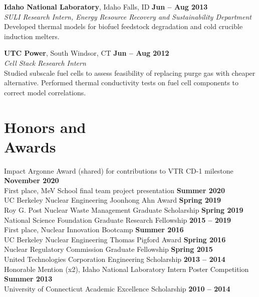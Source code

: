 \documentclass[margin,line]{resume}
\begin{document}
\begin{resume}
\textbf{Idaho National Laboratory}, Idaho Falls, ID \hfill 
    \textbf{Jun -- Aug 2013} \\
\textsl{SULI Research Intern, Energy Resource Recovery and Sustainability Department} \\
Developed thermal models for biofuel feedstock degradation and cold crucible induction melters.

\textbf{UTC Power}, South Windsor, CT \hfill 
    \textbf{Jun -- Aug 2012} \\
\textsl{Cell Stack Research Intern} \\
Studied subscale fuel cells to assess feasibility of replacing purge gas with cheaper alternative. Performed thermal conductivity tests on fuel cell components to correct model correlations.\\

\section{\mysidestyle Honors and\\Awards}
Impact Argonne Award (shared) for contributions to VTR CD-1 milestone \hfill \textbf{November 2020}\vspace{.5mm} \\
First place, MeV School final team project presentation \hfill \textbf{Summer 2020}\vspace{.5mm} \\
UC Berkeley Nuclear Engineering Joonhong Ahn Award \hfill \textbf{Spring 2019}\vspace{.5mm} \\
Roy G. Post Nuclear Waste Management Graduate Scholarship \hfill \textbf{Spring 2019}\vspace{.5mm} \\
National Science Foundation Graduate Research Fellowship \hfill \textbf{2015 -- 2019}\vspace{.5mm} \\
First place, Nuclear Innovation Bootcamp \hfill \textbf{Summer 2016}\vspace{.5mm} \\
UC Berkeley Nuclear Engineering Thomas Pigford Award \hfill \textbf{Spring 2016}\vspace{.5mm} \\	
Nuclear Regulatory Commission Graduate Fellowship \hfill \textbf{Spring 2015}\vspace{.5mm} \\
United Technologies Corporation Engineering Scholarship \hfill \textbf{2013 -- 2014}\vspace{.5mm} \\
Honorable Mention (x2), Idaho National Laboratory Intern Poster Competition \hfill \textbf{Summer 2013}\vspace{.5mm} \\
University of Connecticut Academic Excellence Scholarship \hfill \textbf{2010 -- 2014} \\


\end{resume}
\end{document}
